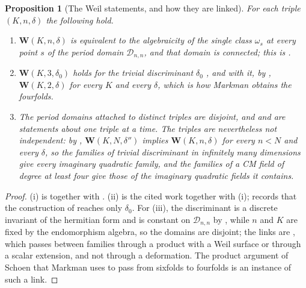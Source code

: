 \documentclass[11pt,reqno]{amsart}
\theoremstyle{plain}
\newtheorem{proposition}[theorem]{Proposition}
\theoremstyle{definition}
\theoremstyle{remark}
\newcommand{\cD}{\mathcal{D}}
\begin{document}
\begin{proposition}[The Weil statements, and how they are linked]\label{prop:separate}
For each triple $(K,n,\delta)$ the following hold.
\begin{enumerate}[label=\textup{(\roman*)},leftmargin=2.6em]
\item $\mathbf{W}(K,n,\delta)$ is equivalent to the algebraicity of the single
  class $\omega_{s}$ at every point $s$ of the period domain $\cD_{n,n}$, and
  that domain is connected; this is \cite[Corollary~15.35]{paperI}.
\item $\mathbf{W}(K,3,\delta_{0})$ holds for the trivial discriminant
  $\delta_{0}$ \cite{Mar25a,Mar25b}, and with it, by ,
  $\mathbf{W}(K,2,\delta)$ for every $K$ and every $\delta$, which is how
  Markman obtains the fourfolds.
\item The period domains attached to distinct triples are disjoint, and
  \cite[Theorem~15.14]{paperI} and \cite[Corollary~15.35]{paperI} are statements about one
  triple at a time. The triples are nevertheless not independent: by
  , $\mathbf{W}(K,N,\delta'')$ implies
  $\mathbf{W}(K,n,\delta)$ for every $n<N$ and every $\delta$, so the families
  of trivial discriminant in infinitely many dimensions give every imaginary
  quadratic family, and the families of a CM field of degree at least four
  give those of the imaginary quadratic fields it contains.
\end{enumerate}
\end{proposition}

\begin{proof}
(i) is \cite[Corollary~15.35]{paperI} together with \cite[Proposition~B.8]{paperI}. (ii) is the
cited work together with (i); \cite[Remark~15.20]{paperI}
records that the construction of \cite[Section~15.1]{paperI} reaches only $\delta_{0}$.
For (iii), the discriminant is a discrete invariant of the hermitian form and
is constant on $\cD_{n,n}$ by \cite[Proposition~15.19(ii)]{paperI}, while $n$ and $K$ are
fixed by the endomorphism algebra, so the domains are disjoint; the links are
, which passes between families through a product with a
Weil surface or through a scalar extension, and not through a deformation.
The product argument of Schoen that Markman uses to pass from sixfolds to
fourfolds is an instance of such a link.
\end{proof}
\end{document}
